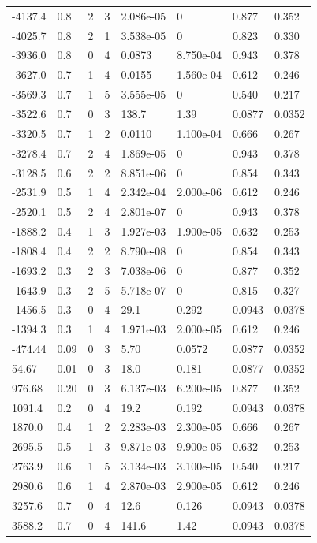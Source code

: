 \documentclass[preview]{standalone}
\begin{document}
{{\begin{tabular}{L{1.2cm}C{1.2cm} C{0.3cm}C{0.5cm} C{1.4cm}C{1.4cm} C{1.4cm}C{1.4cm}}
  -4137.4  &   0.8  & 2     &  3 &  2.086e-05  & 0  & 0.877 &  0.352   \\ 
  -4025.7  &   0.8  & 2     &  1 &  3.538e-05  & 0  & 0.823 &  0.330   \\ 
  -3936.0  &   0.8  & 0     &  4 &  0.0873  & 8.750e-04  & 0.943 &  0.378   \\ 
  -3627.0  &   0.7  & 1     &  4 &  0.0155  & 1.560e-04  & 0.612 &  0.246   \\ 
  -3569.3  &   0.7  & 1     &  5 &  3.555e-05  & 0  & 0.540 &  0.217   \\ 
  -3522.6  &   0.7  & 0     &  3 &  138.7  & 1.39  & 0.0877 &  0.0352   \\ 
  -3320.5  &   0.7  & 1     &  2 &  0.0110  & 1.100e-04  & 0.666 &  0.267   \\ 
  -3278.4  &   0.7  & 2     &  4 &  1.869e-05  & 0  & 0.943 &  0.378   \\ 
  -3128.5  &   0.6  & 2     &  2 &  8.851e-06  & 0  & 0.854 &  0.343   \\ 
  -2531.9  &   0.5  & 1     &  4 &  2.342e-04  & 2.000e-06  & 0.612 &  0.246   \\ 
  -2520.1  &   0.5  & 2     &  4 &  2.801e-07  & 0  & 0.943 &  0.378   \\ 
  -1888.2  &   0.4  & 1     &  3 &  1.927e-03  & 1.900e-05  & 0.632 &  0.253   \\ 
  -1808.4  &   0.4  & 2     &  2 &  8.790e-08  & 0  & 0.854 &  0.343   \\ 
  -1693.2  &   0.3  & 2     &  3 &  7.038e-06  & 0  & 0.877 &  0.352   \\ 
  -1643.9  &   0.3  & 2     &  5 &  5.718e-07  & 0  & 0.815 &  0.327   \\ 
  -1456.5  &   0.3  & 0     &  4 &  29.1  & 0.292  & 0.0943 &  0.0378   \\ 
  -1394.3  &   0.3  & 1     &  4 &  1.971e-03  & 2.000e-05  & 0.612 &  0.246   \\ 
  -474.44  &  0.09  & 0     &  3 &  5.70  & 0.0572  & 0.0877 &  0.0352   \\ 
  54.67  &  0.01  & 0     &  3 &  18.0  & 0.181  & 0.0877 &  0.0352   \\ 
  976.68  &  0.20  & 0     &  3 &  6.137e-03  & 6.200e-05  & 0.877 &  0.352   \\ 
  1091.4  &   0.2  & 0     &  4 &  19.2  & 0.192  & 0.0943 &  0.0378   \\ 
  1870.0  &   0.4  & 1     &  2 &  2.283e-03  & 2.300e-05  & 0.666 &  0.267   \\ 
  2695.5  &   0.5  & 1     &  3 &  9.871e-03  & 9.900e-05  & 0.632 &  0.253   \\ 
  2763.9  &   0.6  & 1     &  5 &  3.134e-03  & 3.100e-05  & 0.540 &  0.217   \\ 
  2980.6  &   0.6  & 1     &  4 &  2.870e-03  & 2.900e-05  & 0.612 &  0.246   \\ 
  3257.6  &   0.7  & 0     &  4 &  12.6  & 0.126  & 0.0943 &  0.0378   \\ 
  3588.2  &   0.7  & 0     &  4 &  141.6  & 1.42  & 0.0943 &  0.0378   \\ 
\hline 
\end{tabular} 

}}
\end{document}
